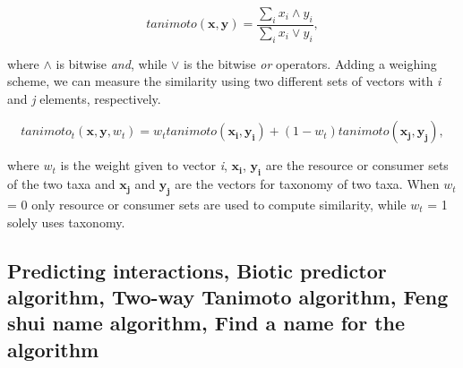 \documentclass[letterpaper]{article}
\begin{document}
\begin{equation}
  tanimoto(\mathbf{x}, \mathbf{y}) = \frac{\sum_i x_i \land y_i}{\sum_i x_i \lor y_i},
\end{equation}

where $\land$ is bitwise \emph{and}, while $\lor$ is the bitwise \emph{or} operators. Adding a weighing scheme, we can measure the similarity using two different sets of vectors with \textit{i} and \textit{j} elements, respectively.

\begin{equation}
  tanimoto_t(\mathbf{x}, \mathbf{y}, w_t) = w_ttanimoto(\mathbf{x_i}, \mathbf{y_i}) + (1 - w_t)tanimoto(\mathbf{x_j}, \mathbf{y_j}),
\end{equation}

where $w_t$ is the weight given to vector \textit{i}, $\mathbf{x_i}$, $\mathbf{y_i}$ are the resource or consumer sets of the two taxa and $\mathbf{x_j}$ and $\mathbf{y_j}$ are the vectors for taxonomy of two taxa. When $w_t$ = 0 only resource or consumer sets are used to compute similarity, while $w_t$ = 1 solely uses taxonomy.


  \subsection{Predicting interactions, Biotic predictor algorithm, Two-way Tanimoto algorithm, Feng shui name algorithm, Find a name for the algorithm}
\end{document}
